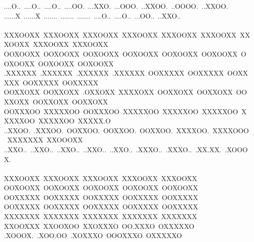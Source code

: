 \documentclass[12pt]{article}
\begin{document}
\begin{center}
{....O..~....O..~....O..~....OO.~...XXO.~...OOO.~..XXOO.~..OOOO.~..XXOO.~\\
......X~......X~.......~.......~.......~....O..~....O..~...OO..~..XXO..~\\
~\\
XXXOOXX~XXXOOXX~XXXOOXX~XXXOOXX~XXXOOXX~XXXOOXX~XXXOOXX~XXXOOXX~XXXOOXX~\\
OOXOOXX~OOXOOXX~OOXOOXX~OOXOOXX~OOXOOXX~OOXOOXX~OOXOOXX~OOXOOXX~OOXOOXX~\\
.XXXXXX~.XXXXXX~.XXXXXX~.XXXXXX~OOXXXXX~OOXXXXX~OOXXXXX~OOXXXXX~OOXXXXX~\\
OOXXOXX~OOXXOXX~.OXXOXX~XXXXOXX~OOXXOXX~OOXXOXX~OOXXOXX~OOXXOXX~OOXXOXX~\\
OOXXXOO~XXXXXOO~OOXXXOO~XXXXXOO~XXXXXOO~XXXXXOO~XXXXXOO~XXXXXOO~XXXXX.O~\\
..XXOO.~.XXXOO.~OOXXOO.~OOXXOO.~OOXXOO.~XXXXOO.~XXXXOOO~XXXXXXX~XXOOOXX~\\
..XXO..~..XXO..~..XXO..~..XXO..~..XXO..~.XXXO..~.XXXO..~.XX.XX.~.XOOOX.~\\
~\\
XXXOOXX~XXXOOXX~XXXOOXX~XXXOOXX~XXXOOXX~\\
OOXOOXX~OOXOOXX~OOXOOXX~OOXOOXX~OOXOOXX~\\
OOXXXXX~OOXXXXX~OOXXXXX~OOXXXXX~OOXXXXX~\\
OOXXXXX~OOXXXXX~OOXXXXX~OOXXXXX~OOXXXXX~\\
XXXXXXX~XXXXXXX~XXXXXXX~XXXXXXX~XXXXXXX~\\
XXOOXXX~XXOOXOO~XXOXXXO~OO.XXXO~OXXXXXO~\\
.XOOOX.~.XOO.OO~.XOXXXO~OOOXXXO~OXXXXXO~
}\end{center}
\end{document}
